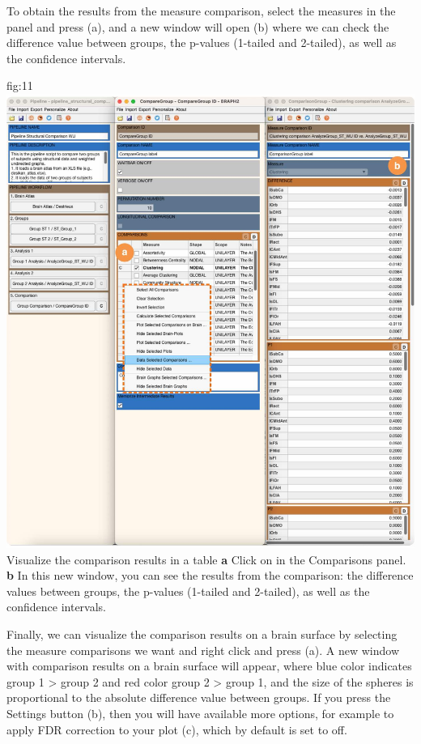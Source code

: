 \documentclass[justified]{tufte-handout}
\begin{document}
 
To obtain the results from the measure comparison, select the measures in the  panel and press ({a}), and a new window will open ({b}) where we can check the difference value between groups, the p-values (1-tailed and 2-tailed), as well as the confidence intervals.

	{fig:11}
	{\includegraphics{fig11.jpg}}
	{Visualize the comparison results in a table}
	{
	{\bf a} Click on  in the Comparisons panel.
	{\bf b} In this new window, you can see the results from the comparison: the difference values between groups, the p-values (1-tailed and 2-tailed), as well as the confidence intervals.
	}


Finally, we can visualize the comparison results on a brain surface by selecting the measure comparisons we want and right click and press  ({a}). A new window with comparison results on a brain surface will appear, where blue color indicates group 1 > group 2 and red color group 2 > group 1, and the size of the spheres is proportional to the absolute difference value between groups. If you press the Settings button ({b}), then you will have available more options, for example to apply FDR correction to your plot ({c}), which by default is set to off.
\end{document}

